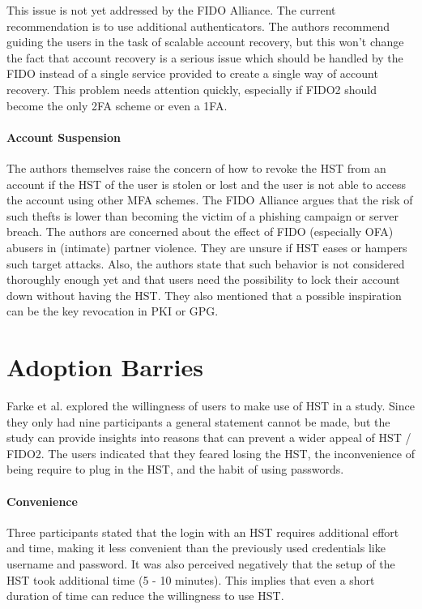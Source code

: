 \documentclass[runningheads]{llncs}
\begin{document}
This issue is not yet addressed by the FIDO Alliance. The current recommendation is to use additional authenticators. The authors recommend guiding the users in the task of scalable account recovery, but this won't change the fact that account recovery is a serious issue which should be handled by the FIDO instead of a single service provided to create a single way of account recovery. This problem needs attention quickly, especially if FIDO2 should become the only 2FA scheme or even a 1FA. 

\paragraph{Account Suspension}
The authors themselves raise the concern of how to revoke the HST from an account if the HST of the user is stolen or lost and the user is not able to access the account using other MFA schemes. The FIDO Alliance argues that the risk of such thefts is lower than becoming the victim of a phishing campaign or server breach. The authors are concerned about the effect of FIDO (especially OFA) abusers in (intimate) partner violence. They are unsure if HST eases or hampers such target attacks. Also, the authors state that such behavior is not considered thoroughly enough yet and that users need the possibility to lock their account down without having the HST. They also mentioned that a possible inspiration can be the key revocation in PKI or GPG.

\section{Adoption Barries}
Farke et al. explored the willingness of users to make use of HST in a study. Since they only had nine participants a general statement cannot be made, but the study can provide insights into reasons that can prevent a wider appeal of HST / FIDO2. The users indicated that they feared losing the HST, the inconvenience of being require to plug in the HST, and the habit of using passwords.

\paragraph{Convenience}
Three participants stated that the login with an HST requires additional effort and time, making it less convenient than the previously used credentials like username and password. It was also perceived negatively that the setup of the HST took additional time (5 - 10 minutes). This implies that even a short duration of time can reduce the willingness to use HST.
\end{document}

